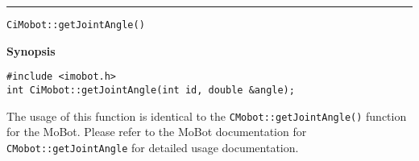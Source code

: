 \noindent
\vspace{5pt}
\rule{6.5in}{0.015in}
\noindent
{\LARGE \texttt{CiMobot::getJointAngle()}}\\
{}

\noindent
{\bf Synopsis}\\
\begin{verbatim}
#include <imobot.h>
int CiMobot::getJointAngle(int id, double &angle);
\end{verbatim}

The usage of this function is identical to the
\texttt{CMobot::getJointAngle()} function for the MoBot. Please refer
to the MoBot documentation for \texttt{CMobot::getJointAngle} for
detailed usage documentation.

